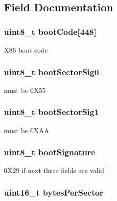 \subsection{Field Documentation}
\hypertarget{structfat__boot_a3a3b1f80267552c92749bd86827821a2}{
\subsubsection[{boot\-Code}]{\setlength{\rightskip}{0pt plus 5cm}uint8\-\_\-t boot\-Code\mbox{[}448\mbox{]}}}\label{structfat__boot_a3a3b1f80267552c92749bd86827821a2}
X86 boot code \hypertarget{structfat__boot_abdaf2cc75b74800944ede557442ca5bd}{
\subsubsection[{boot\-Sector\-Sig0}]{\setlength{\rightskip}{0pt plus 5cm}uint8\-\_\-t boot\-Sector\-Sig0}}\label{structfat__boot_abdaf2cc75b74800944ede557442ca5bd}
must be 0\-X55 \hypertarget{structfat__boot_a44983e94ecddbdcb7ab691e493a13d94}{
\subsubsection[{boot\-Sector\-Sig1}]{\setlength{\rightskip}{0pt plus 5cm}uint8\-\_\-t boot\-Sector\-Sig1}}\label{structfat__boot_a44983e94ecddbdcb7ab691e493a13d94}
must be 0\-X\-A\-A \hypertarget{structfat__boot_acc4a4e4c22b630d12c1b2c2b8c7eb366}{
\subsubsection[{boot\-Signature}]{\setlength{\rightskip}{0pt plus 5cm}uint8\-\_\-t boot\-Signature}}\label{structfat__boot_acc4a4e4c22b630d12c1b2c2b8c7eb366}
0\-X29 if next three fields are valid \hypertarget{structfat__boot_adb2ddeae74baf681103d21d724814a63}{
\subsubsection[{bytes\-Per\-Sector}]{\setlength{\rightskip}{0pt plus 5cm}uint16\-\_\-t bytes\-Per\-Sector}}\label{structfat__boot_adb2ddeae74baf681103d21d724814a63}

